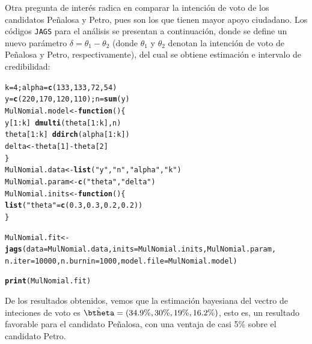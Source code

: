 \documentclass[10pt,openright]{book}\usepackage[]{graphicx}\usepackage[]{color}
\makeatletter
\newcommand{\hlnum}[1]{\textcolor[rgb]{0.686,0.059,0.569}{#1}}%
\newcommand{\hlstr}[1]{\textcolor[rgb]{0.192,0.494,0.8}{#1}}%
\newcommand{\hlopt}[1]{\textcolor[rgb]{0,0,0}{#1}}%
\newcommand{\hlstd}[1]{\textcolor[rgb]{0.345,0.345,0.345}{#1}}%
\newcommand{\hlkwa}[1]{\textcolor[rgb]{0.161,0.373,0.58}{\textbf{#1}}}%
\newcommand{\hlkwb}[1]{\textcolor[rgb]{0.69,0.353,0.396}{#1}}%
\newcommand{\hlkwc}[1]{\textcolor[rgb]{0.333,0.667,0.333}{#1}}%
\newcommand{\hlkwd}[1]{\textcolor[rgb]{0.737,0.353,0.396}{\textbf{#1}}}%
\newenvironment{kframe}{%
 \def\at@end@of@kframe{}%
 \ifinner\ifhmode%
  \def\at@end@of@kframe{\end{minipage}}%
  \begin{minipage}{\columnwidth}%
 \fi\fi%
 \def\FrameCommand##1{\hskip\@totalleftmargin \hskip-\fboxsep
 \colorbox{shadecolor}{##1}\hskip-\fboxsep
     \hskip-\linewidth \hskip-\@totalleftmargin \hskip\columnwidth}%
 \MakeFramed {\advance\hsize-\width
   \@totalleftmargin\z@ \linewidth\hsize
   \@setminipage}}%
 {\par\unskip\endMakeFramed%
 \at@end@of@kframe}
\newenvironment{knitrout}{}{} %
\makeatother
\begin{document}
\begin{Eje}
Otra pregunta de inter\'es radica en comparar la intenci\'on de voto de los candidatos Pe\~nalosa y Petro, pues son los que tienen mayor apoyo ciudadano. Los c\'odigos \verb'JAGS' para el an\'alisis se presentan a continuaci\'on, donde se define un nuevo par\'ametro $\delta=\theta_1-\theta_2$ (donde $\theta_1$ y $\theta_2$ denotan la intenci\'on de voto de Pe\~nalosa y Petro, respectivamente), del cual se obtiene estimaci\'on e intervalo de credibilidad:

\begin{knitrout}
\color{fgcolor}\begin{kframe}
\begin{alltt}
\hlstd{k}\hlkwb{=}\hlnum{4}\hlstd{; alpha}\hlkwb{=}\hlkwd{c}\hlstd{(}\hlnum{133}\hlstd{,}\hlnum{133}\hlstd{,}\hlnum{72}\hlstd{,}\hlnum{54}\hlstd{)}
\hlstd{y}\hlkwb{=}\hlkwd{c}\hlstd{(}\hlnum{220}\hlstd{,}\hlnum{170}\hlstd{,}\hlnum{120}\hlstd{,}\hlnum{110}\hlstd{); n}\hlkwb{=}\hlkwd{sum}\hlstd{(y)}
\hlstd{MulNomial.model} \hlkwb{<-} \hlkwa{function}\hlstd{()\{}
     \hlstd{y[}\hlnum{1}\hlopt{:}\hlstd{k]} \hlopt{~} \hlkwd{dmulti}\hlstd{(theta[}\hlnum{1}\hlopt{:}\hlstd{k],n)}
    \hlstd{theta[}\hlnum{1}\hlopt{:}\hlstd{k]} \hlopt{~} \hlkwd{ddirch}\hlstd{(alpha[}\hlnum{1}\hlopt{:}\hlstd{k])}
    \hlstd{delta} \hlkwb{<-} \hlstd{theta[}\hlnum{1}\hlstd{]}\hlopt{-}\hlstd{theta[}\hlnum{2}\hlstd{]}
\hlstd{\}}
\hlstd{MulNomial.data} \hlkwb{<-} \hlkwd{list}\hlstd{(}\hlstr{"y"}\hlstd{,}\hlstr{"n"}\hlstd{,}\hlstr{"alpha"}\hlstd{,}\hlstr{"k"}\hlstd{)}
\hlstd{MulNomial.param} \hlkwb{<-} \hlkwd{c}\hlstd{(}\hlstr{"theta"}\hlstd{,} \hlstr{"delta"}\hlstd{)}
\hlstd{MulNomial.inits} \hlkwb{<-} \hlkwa{function}\hlstd{()\{}
  \hlkwd{list}\hlstd{(}\hlstr{"theta"}\hlstd{=}\hlkwd{c}\hlstd{(}\hlnum{0.3}\hlstd{,}\hlnum{0.3}\hlstd{,}\hlnum{0.2}\hlstd{,}\hlnum{0.2}\hlstd{))}
\hlstd{\}}

\hlstd{MulNomial.fit} \hlkwb{<-} \hlkwd{jags}\hlstd{(}\hlkwc{data}\hlstd{=MulNomial.data,} \hlkwc{inits}\hlstd{=MulNomial.inits, MulNomial.param,}
                      \hlkwc{n.iter}\hlstd{=}\hlnum{10000}\hlstd{,} \hlkwc{n.burnin}\hlstd{=}\hlnum{1000}\hlstd{,} \hlkwc{model.file}\hlstd{=MulNomial.model)}

\hlkwd{print}\hlstd{(MulNomial.fit)}
\end{alltt}
\end{kframe}
\end{knitrout}
De los resultados obtenidos, vemos que la estimaci\'on bayesiana del vectro de inteciones de voto es $\hat{\btheta}=(34.9\%, 30\%, 19\%, 16.2\%)$, esto es, un resultado favorable para el candidato Pe\~nalosa, con una ventaja de casi 5\% sobre el candidato Petro. 


\end{Eje}
\end{document}

